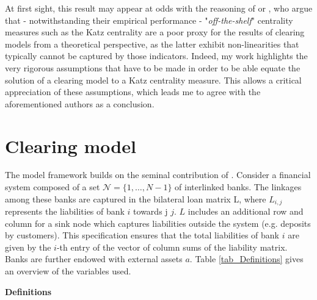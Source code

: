 \documentclass[authoryear,12pt]{elsarticle}
\begin{document}
At first sight, this result may appear at odds with the reasoning of \cite{Acemoglu2015} or \cite{Tahbaz-Salehi2015}, who argue that - notwithstanding their empirical performance - "\textit{off-the-shelf}" centrality measures such as the Katz centrality are a poor proxy for the results of clearing models from a theoretical perspective, as the latter exhibit non-linearities that typically cannot be captured by those indicators. Indeed, my work highlights the very rigorous assumptions that have to be made in order to be able equate the solution of a clearing model to a Katz centrality measure. This allows a critical appreciation of these assumptions, which leads me to agree with the aforementioned authors as a conclusion.

\section{Clearing model}

The model framework builds on the seminal contribution of \cite{Eisenberg2001}. Consider a financial system composed of a set $\mathscr{N}=\{1,\dots,N-1\}$ of interlinked banks. The linkages among these banks are captured in the bilateral loan matrix L, where $L_{i,j}$ represents the liabilities of bank $i$ towards j $j$. $L$ includes an additional row and column for a sink node which captures liabilities outside the system (e.g. deposits by customers). This specification ensures that the total liabilities of bank $i$ are given by the $i$-th entry of the vector of column sums of the liability matrix. Banks are further endowed with external assets $a$. Table \ref{tab_Definitions} gives an overview of the variables used. 

\textbf{Definitions}
\end{document}

